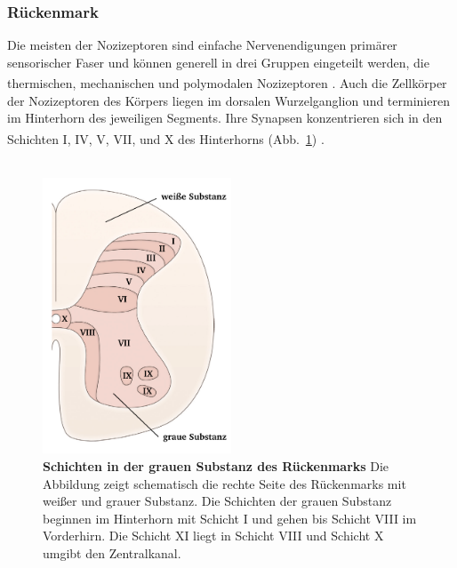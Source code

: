 \documentclass[12pt,a4paper,pdftex]{article}
\begin{document}
\subsubsection*{Rückenmark}

Die meisten der Nozizeptoren sind einfache Nervenendigungen primärer sensorischer Faser und können generell in drei Gruppen eingeteilt werden, die thermischen, mechanischen und polymodalen Nozizeptoren \textsuperscript{\cite[24]{kandel2013principles}}. Auch die Zellkörper der Nozizeptoren des Körpers liegen im dorsalen Wurzelganglion und terminieren im Hinterhorn des jeweiligen Segments. Ihre Synapsen konzentrieren sich in den Schichten I, IV, V, VII, und X des Hinterhorns (Abb.~\ref{fig:graymatter}) \textsuperscript{\cite[25]{paxinos2014rat}}.
\\
\\

\begin{figure}[H]
        \centering
        \includegraphics[width = 0.5\textwidth] {pictures/somatosensory/gray_matter.png}
        \caption[Schichten in der grauen Substanz des Rückenmarks]{\textbf{Schichten in der grauen Substanz des Rückenmarks} Die Abbildung zeigt schematisch die rechte Seite des Rückenmarks mit weißer und grauer Substanz. Die Schichten der grauen Substanz beginnen im Hinterhorn mit Schicht I und gehen bis Schicht VIII im Vorderhirn. Die Schicht XI liegt in Schicht VIII und Schicht X umgibt den Zentralkanal.\\
        \cite[8]{crossman2014neuroanatomy}}
        \label{fig:graymatter}
    \end{figure}
\end{document}
